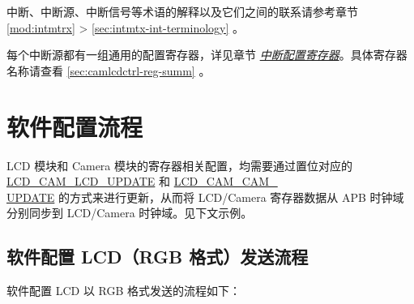 \documentclass[main\_\_CN.tex]{subfiles}
\begin{document}
\begin{tiplisting}
中断、中断源、中断信号等术语的解释以及它们之间的联系请参考章节 \ref{mod:intmtrx} \textit{} > \ref{sec:intmtx-int-terminology} \textit{}。
\end{tiplisting}

每个中断源都有一组通用的配置寄存器，详见章节 \hyperref[interrupt-config-registers]{\textit{中断配置寄存器}}。具体寄存器名称请查看 \ref{sec:camlcdctrl-reg-summ} \textit{}。

\section{软件配置流程}

\begin{tiplisting}
LCD 模块和 Camera 模块的寄存器相关配置，均需要通过置位对应的 \hyperref[fielddesc:LCDCAMLCDUPDATE]{LCD\_CAM\_LCD\_UPDATE} 和 \hyperref[fielddesc:LCDCAMCAMUPDATE]{LCD\_CAM\_CAM\_\\UPDATE} 的方式来进行更新，从而将 LCD/Camera 寄存器数据从 APB 时钟域分别同步到 LCD/Camera 时钟域。见下文示例。
\end{tiplisting}
\vspace{-2em}
\subsection{软件配置 LCD（RGB 格式）发送流程}
软件配置 LCD 以 RGB 格式发送的流程如下：
\end{document}
